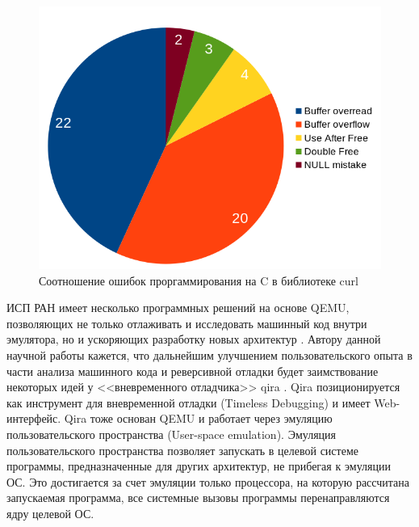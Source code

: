 \begin{figure}[!htbp]
    \centering
    \begin{adjustbox}{max totalsize={0.8\textwidth}{\textheight}}
        \includegraphics[]{images/curl-c-issues.png}
    \end{adjustbox}
    \caption{Соотношение ошибок проргаммирования на C в библиотеке curl}\label{fig:curl-c-issues}
\end{figure}

ИСП РАН имеет несколько программных решений на основе QEMU, позволяющих не только отлаживать и исследовать
машинный код внутри эмулятора, но и ускоряющих разработку новых архитектур \cite{imposters-toolset}.
Автору данной научной работы кажется, что дальнейшим улучшением пользовательского опыта в части анализа машинного кода
и реверсивной отладки будет заимствование некоторых идей у <<вневременного отладчика>> qira \cite{qira}.
Qira позиционируется как инструмент для вневременной отладки (Timeless Debugging) и имеет Web-интерфейс.
Qira тоже основан QEMU и работает через эмуляцию пользовательского пространства (User-space emulation).
Эмуляция пользовательского пространства позволяет запускать в целевой системе программы,
предназначенные для других архитектур, не прибегая к эмуляции ОС.
Это достигается за счет эмуляции только процессора, на которую рассчитана запускаемая
программа, все системные вызовы программы перенаправляются ядру целевой ОС.

